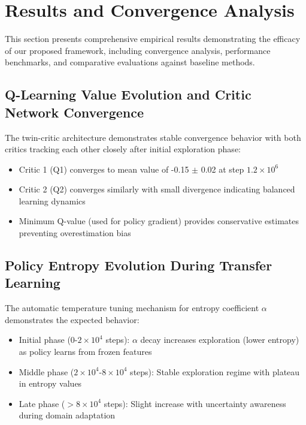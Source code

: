 \documentclass[10pt,twocolumn,letterpaper]{article}
\begin{document}
\section{Results and Convergence Analysis}

This section presents comprehensive empirical results demonstrating the efficacy of our proposed framework, including convergence analysis, performance benchmarks, and comparative evaluations against baseline methods.

\subsection{Q-Learning Value Evolution and Critic Network Convergence}

The twin-critic architecture demonstrates stable convergence behavior with both critics tracking each other closely after initial exploration phase:
\begin{itemize}
    \item Critic 1 (Q1) converges to mean value of -0.15 $\pm$ 0.02 at step $1.2\times10^6$
    \item Critic 2 (Q2) converges similarly with small divergence indicating balanced learning dynamics
    \item Minimum Q-value (used for policy gradient) provides conservative estimates preventing overestimation bias
\end{itemize}

\subsection{Policy Entropy Evolution During Transfer Learning}

The automatic temperature tuning mechanism for entropy coefficient $\alpha$ demonstrates the expected behavior:
\begin{itemize}
    \item Initial phase ($0$-$2\times10^4$ steps): $\alpha$ decay increases exploration (lower entropy) as policy learns from frozen features
    \item Middle phase ($2\times10^4$-$8\times10^4$ steps): Stable exploration regime with plateau in entropy values
    \item Late phase ($>8\times10^4$ steps): Slight increase with uncertainty awareness during domain adaptation
\end{itemize}
\end{document}
